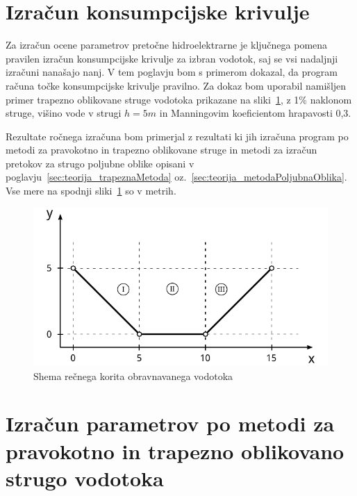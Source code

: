 \newpage

\section{Izračun konsumpcijske krivulje}\label{sec:izracun}

Za izračun ocene parametrov pretočne hidroelektrarne je ključnega pomena pravilen izračun konsumpcijske krivulje za izbran vodotok, saj se vsi nadaljnji izračuni nanašajo nanj. V tem poglavju bom s primerom dokazal, da program računa točke konsumpcijske krivulje pravilno. Za dokaz bom uporabil namišljen primer trapezno oblikovane struge vodotoka prikazane na sliki~\ref{fig:izracun_trapeznaStruga}, z 1\% naklonom struge, višino vode v strugi $h=5m$ in Manningovim koeficientom hrapavosti 0,3.

Rezultate ročnega izračuna bom primerjal z rezultati ki jih izračuna program po metodi za pravokotno in trapezno oblikovane struge in metodi za izračun pretokov za strugo poljubne oblike opisani v poglavju~\ref{sec:teorija_trapeznaMetoda}  oz.~\ref{sec:teorija_metodaPoljubnaOblika}. Vse mere na spodnji  sliki~\ref{fig:izracun_trapeznaStruga} so v metrih.



\begin{figure}[ht!]
	\begin{centering}
		\includegraphics{slike/izracuni/shema_trapezneStruge.pdf}		
		\caption{Shema rečnega korita obravnavanega vodotoka}\label{fig:izracun_trapeznaStruga}
	\end{centering}
\end{figure}




\section{Izračun parametrov po metodi za pravokotno in trapezno oblikovano strugo vodotoka}\label{sec:izracun_trapeznaMetoda}

